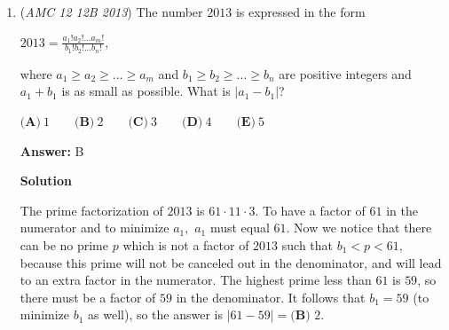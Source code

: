 \begin{enumerate}
 



\textbf{Solution 2}

WLOG, let $a_i$, $b_i$ be the sequences with $a_1<b_1$. Then 
 \[N=5a_1+8a_2=5b_1+8b_2\] or 
 \[5a_1+8a_2=5(a_1+c)+8(a_2-d)\] for some natural numbers $c$, $d$. Thus $5c=8d$. To minimize $c$ and $d$, we have $(c,d)=(8,5)$, or 
 \[5a_1+8a_2=5(a_1+8)+8(a_2-5).\] To minimize $a_1$ and $b_1$, we have $(a_1,b_1)=(0,0+c)=(0,8)$. Using the same method, since $b_2\ge b_1$, we have $b_2\ge8$. 

 Thus the minimum $N=5b_1+8b_2= \boxed{\textbf{(C) }104}$.

 



\textbf{Solution 3}

Do the same thing as any of the previous solutions to find the 7th term must be in the form $5a+8b$ and $5c+8d$ where $a\neq c$. Then test the options and find the smallest number that can be expressed in these 2 ways is $\boxed{\textbf{(C) }104}$.

 -Andrew2019

 


	\item (\textit{AMC 12 12B 2013}) 
The number $2013$ is expressed in the form 
 

  $2013 = \frac {a_1!a_2!...a_m!}{b_1!b_2!...b_n!}$,

 
where $a_1 \ge a_2 \ge ... \ge a_m$ and $b_1 \ge b_2 \ge ... \ge b_n$ are positive integers and $a_1 + b_1$ is as small as possible. What is $|a_1 - b_1|$?


 $\textbf{(A)}\ 1 \qquad \textbf{(B)}\ 2 \qquad \textbf{(C)}\ 3 \qquad \textbf{(D)}\ 4 \qquad \textbf{(E)}\ 5$

 \textbf{Answer: }B



\textbf{Solution}

The prime factorization of $2013$ is $61\cdot11\cdot3$. To have a factor of $61$ in the numerator and to minimize $a_1,$ $a_1$ must equal $61$. Now we notice that there can be no prime $p$ which is not a factor of $2013$ such that $b_1<p<61,$ because this prime will not be canceled out in the denominator, and will lead to an extra factor in the numerator. The highest prime less than $61$ is $59$, so there must be a factor of $59$ in the denominator. It follows that $b_1 = 59$ (to minimize $b_1$ as well), so the answer is $|61-59| = \boxed{\textbf{(B) }2}$.

 



\end{enumerate}
